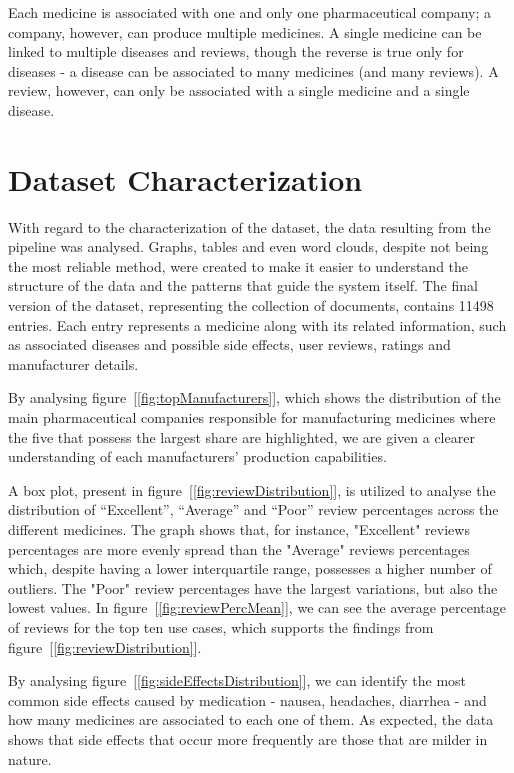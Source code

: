 \documentclass[sigconf]{acmart}
\begin{document}
Each medicine is associated with one and only one pharmaceutical company; a company, however, can produce multiple medicines. A single medicine can be linked to multiple diseases and reviews, though the reverse is true only for diseases - a disease can be associated to many medicines (and many reviews). A review, however, can only be associated with a single medicine and a single disease.

\section{Dataset Characterization}

With regard to the characterization of the dataset, the data resulting from the pipeline was analysed. Graphs, tables and even word clouds, despite not being the most reliable method, were created to make it easier to understand the structure of the data and the patterns that guide the system itself.
The final version of the dataset, representing the collection of documents, contains 11498 entries. Each entry represents a medicine along with its related information, such as associated diseases and possible side effects, user reviews, ratings and manufacturer details.

By analysing figure~[\ref{fig:topManufacturers}], which shows the distribution of the main pharmaceutical companies responsible for manufacturing medicines where the five that possess the largest share are highlighted, we are given a clearer understanding of each manufacturers' production capabilities.

A box plot, present in figure~[\ref{fig:reviewDistribution}], is utilized to analyse the distribution of “Excellent”, “Average” and “Poor” review percentages across the different medicines. The graph shows that, for instance, "Excellent" reviews percentages are more evenly spread than the "Average" reviews percentages which, despite having a lower interquartile range\cite{iqrange}, possesses a higher number of outliers. The "Poor" review percentages have the largest variations, but also the lowest values. 
In figure~[\ref{fig:reviewPercMean}], we can see the average percentage of reviews for the top ten use cases, which supports the findings from figure~[\ref{fig:reviewDistribution}].

By analysing figure~[\ref{fig:sideEffectsDistribution}], we can identify the most common side effects caused by medication - nausea, headaches, diarrhea - and how many medicines are associated to each one of them. As expected, the data shows that side effects that occur more frequently are those that are milder in nature.
\end{document}
